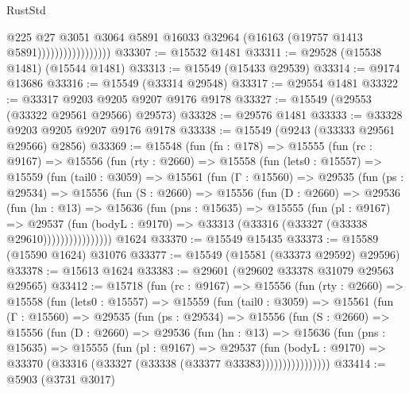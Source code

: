 \begin{lexlean}{RustStd}
\begin{coremodule}
                                  @225
                                  @27
                                  @3051
                                  @3064
                                  @5891
                                  @16033
                                  @32964
                                  (@16163 (@19757 @1413 @5891)))))))))))))))))
@33307 := @15532 @1481
@33311 := @29528 (@15538 @1481) (@15544 @1481)
@33313 := @15549 (@15433 @29539)
@33314 := @9174 @13686
@33316 := @15549 (@33314 @29548)
@33317 := @29554 @1481
@33322 := @33317 @9203 @9205 @9207 @9176 @9178
@33327 := @15549 (@29553 (@33322 @29561 @29566) @29573)
@33328 := @29576 @1481
@33333 := @33328 @9203 @9205 @9207 @9176 @9178
@33338 := @15549 (@9243 (@33333 @29561 @29566) @2856)
@33369 := @15548
    (fun (fn : @178) =>
    @15555
      (fun (rc : @9167) =>
      @15556
        (fun (rty : @2660) =>
        @15558
          (fun (lets0 : @15557) =>
          @15559
            (fun (tail0 : @3059) =>
            @15561
              (fun (Γ : @15560) =>
              @29535
                (fun (ps : @29534) =>
                @15556
                  (fun (S : @2660) =>
                  @15556
                    (fun (D : @2660) =>
                    @29536
                      (fun (hn : @13) =>
                      @15636
                        (fun (pns : @15635) =>
                        @15555
                          (fun (pl : @9167) =>
                          @29537
                            (fun (bodyL : @9170) =>
                            @33313 (@33316 (@33327 (@33338 @29610))))))))))))))))
    @1624
@33370 := @15549 @15435
@33373 := @15589 (@15590 @1624) @31076
@33377 := @15549 (@15581 (@33373 @29592) @29596)
@33378 := @15613 @1624
@33383 := @29601 (@29602 @33378 @31079 @29563 @29565)
@33412 := @15718
    (fun (rc : @9167) =>
    @15556
      (fun (rty : @2660) =>
      @15558
        (fun (lets0 : @15557) =>
        @15559
          (fun (tail0 : @3059) =>
          @15561
            (fun (Γ : @15560) =>
            @29535
              (fun (ps : @29534) =>
              @15556
                (fun (S : @2660) =>
                @15556
                  (fun (D : @2660) =>
                  @29536
                    (fun (hn : @13) =>
                    @15636
                      (fun (pns : @15635) =>
                      @15555
                        (fun (pl : @9167) =>
                        @29537
                          (fun (bodyL : @9170) =>
                          @33370 (@33316 (@33327 (@33338 (@33377 @33383))))))))))))))))
@33414 := @5903 (@3731 @3017)

\end{coremodule}
\end{lexlean}
